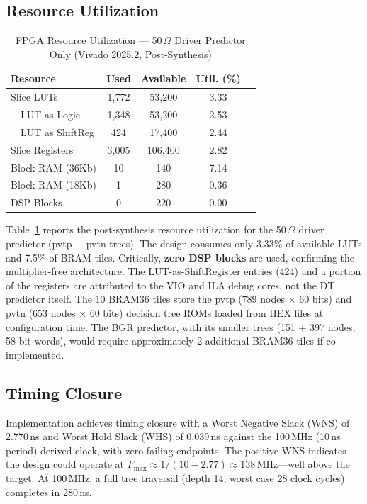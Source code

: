 \documentclass[lettersize,journal]{IEEEtran}
\begin{document}
\subsection{Resource Utilization}

\begin{table}[!t]
\caption{FPGA Resource Utilization --- 50\,$\Omega$ Driver Predictor Only (Vivado 2025.2, Post-Synthesis)\label{tab:fpga}}
\centering
\begin{tabular}{lcccr}
\toprule
\textbf{Resource} & \textbf{Used} & \textbf{Available} & \textbf{Util. (\%)} \\
\midrule
Slice LUTs     & 1,772  & 53,200  & 3.33 \\
~~LUT as Logic & 1,348  & 53,200  & 2.53 \\
~~LUT as ShiftReg & 424 & 17,400  & 2.44 \\
Slice Registers & 3,005 & 106,400 & 2.82 \\
Block RAM (36Kb) & 10   & 140     & 7.14 \\
Block RAM (18Kb) & 1    & 280     & 0.36 \\
DSP Blocks     & 0     & 220     & 0.00 \\
\bottomrule
\end{tabular}
\end{table}

Table~\ref{tab:fpga} reports the post-synthesis resource utilization for the 50\,$\Omega$ driver predictor (pvtp + pvtn trees). The design consumes only 3.33\% of available LUTs and 7.5\% of BRAM tiles. Critically, \textbf{zero DSP blocks} are used, confirming the multiplier-free architecture. The LUT-as-ShiftRegister entries (424) and a portion of the registers are attributed to the VIO and ILA debug cores, not the DT predictor itself. The 10 BRAM36 tiles store the pvtp (789 nodes $\times$ 60 bits) and pvtn (653 nodes $\times$ 60 bits) decision tree ROMs loaded from HEX files at configuration time. The BGR predictor, with its smaller trees (151 + 397 nodes, 58-bit words), would require approximately 2 additional BRAM36 tiles if co-implemented.

\subsection{Timing Closure}
Implementation achieves timing closure with a Worst Negative Slack (WNS) of 2.770\,ns and Worst Hold Slack (WHS) of 0.039\,ns against the 100\,MHz (10\,ns period) derived clock, with zero failing endpoints. The positive WNS indicates the design could operate at $F_{\max} \approx 1/(10 - 2.77) \approx 138$\,MHz---well above the target. At 100\,MHz, a full tree traversal (depth 14, worst case 28 clock cycles) completes in 280\,ns.
\end{document}
